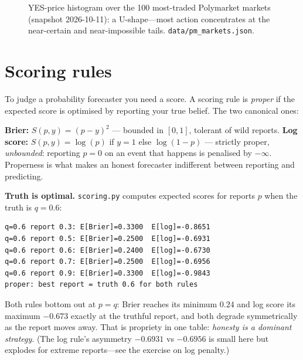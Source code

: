 \begin{figure}[htbp]\centering

\caption{YES-price histogram over the 100 most-traded Polymarket markets (snapshot
2026-10-11): a U-shape---most action concentrates at the near-certain and near-impossible
tails. \texttt{data/pm\_markets.json}.}
\label{fig:pmhist}
\end{figure}

\section{Scoring rules}\label{sec:scoring}

To judge a probability forecaster you need a score. A scoring rule is \emph{proper} if the
expected score is optimised by reporting your true belief. The two canonical ones:

\begin{principle}
\textbf{Brier:} $S(p,y)=(p-y)^2$ --- bounded in $[0,1]$, tolerant of wild reports.
\textbf{Log score:} $S(p,y)=\log(p)$ if $y{=}1$ else $\log(1-p)$ --- strictly proper,
\emph{unbounded}: reporting $p=0$ on an event that happens is penalised by $-\infty$.
Properness is what makes an honest forecaster indifferent between reporting and predicting.
\end{principle}

\begin{example}\label{ex:proper}
\textbf{Truth is optimal.} \texttt{scoring.py} computes expected scores for reports $p$ when
the truth is $q=0.6$:
\begin{lstlisting}[numbers=none]
q=0.6 report 0.3: E[Brier]=0.3300  E[log]=-0.8651
q=0.6 report 0.5: E[Brier]=0.2500  E[log]=-0.6931
q=0.6 report 0.6: E[Brier]=0.2400  E[log]=-0.6730
q=0.6 report 0.7: E[Brier]=0.2500  E[log]=-0.6956
q=0.6 report 0.9: E[Brier]=0.3300  E[log]=-0.9843
proper: best report = truth 0.6 for both rules
\end{lstlisting}
\begin{solution}
Both rules bottom out at $p=q$: Brier reaches its minimum $0.24$ and log score its maximum
$-0.673$ exactly at the truthful report, and both degrade symmetrically as the report moves
away. That is propriety in one table: \emph{honesty is a dominant strategy}. (The log rule's
asymmetry $-0.6931$ vs $-0.6956$ is small here but explodes for extreme reports---see the
exercise on log penalty.)
\end{solution}
\end{example}

